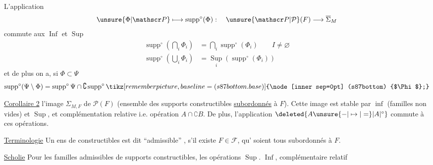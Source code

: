 \clearpage
{}

\begin{samepage}
\noindent{} L'application
\[
\unsure{\Phi|\mathscr P}\longmapsto\operatorname{supp}^{\circ}(\Phi):\quad\unsure{\mathscr P|\mathcal P}(F)\longrightarrow\overline\Sigma_M
\]
commute aux $\operatorname{Inf}$ et $\operatorname{Sup}$
\[
\begin{aligned}
\operatorname{supp}^{\circ}\left(\bigcap_i\Phi_i\right)&=\bigcap_i\operatorname{supp}^{\circ}(\Phi_i)\qquad I\neq\varnothing\\
\operatorname{supp}^{\circ}\left(\bigcup_i\Phi_i\right)&=\operatorname*{Sup}_i(\operatorname{supp}^{\circ}(\Phi_i))
\end{aligned}
\]
et de plus on a, si $\Phi\subset\Psi$
\[
\operatorname{supp}^{\circ}(\Psi\setminus\Phi)=\operatorname{supp}^{\circ}\Psi\cap\complement\operatorname{supp}^{\circ}\tikz[remember picture,baseline=(s87bottom.base)]{\node[inner sep=0pt] (s87bottom) {$\Phi$};}
\]
\end{samepage}

\uline{Corollaire 2}   l'image $\Sigma_{M,F}$ de $\mathscr P(F)$ (ensemble des supports constructibles \uline{subordonnés} à $F$). Cette image est stable  par $\operatorname{inf}$ (familles non vides) et $\operatorname{Sup}$, et complémentation relative i.e. opération $A\cap\complement B$. De plus, l'application $\deleted{A\unsure{-|\mapsto|=} |A|^{\circ}}$
commute à ces opérations.

\uline{Terminologie} Un ens de  constructibles  est dit ``admissible'' , s'il existe $F\in\mathscr F$,  qu' soient tous  subordonnés à $F$.

\uline{Scholie} Pour les familles admissibles de supports constructibles, les opérations $\operatorname{Sup}.$ $\operatorname{Inf}$, complémentaire relatif 
